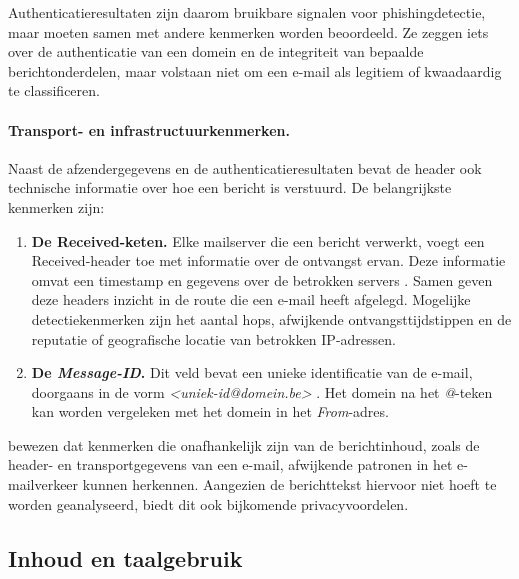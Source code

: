 Authenticatieresultaten zijn daarom bruikbare signalen voor phishingdetectie, maar moeten samen met andere kenmerken worden beoordeeld. Ze zeggen iets over de authenticatie van een domein en de integriteit van bepaalde berichtonderdelen, maar volstaan niet om een e-mail als legitiem of kwaadaardig te classificeren.

\paragraph{Transport- en infrastructuurkenmerken.}
\label{subsec:afzender-headers:transport}
Naast de afzendergegevens en de authenticatieresultaten bevat de header ook technische informatie over hoe een bericht is verstuurd. De belangrijkste kenmerken zijn:

\begin{enumerate}
    \item \textbf{De Received-keten.} Elke mailserver die een bericht verwerkt, voegt een Received-header toe met informatie over de ontvangst ervan. Deze informatie omvat een timestamp en gegevens over de betrokken servers \autocite{Resnick2008}. Samen geven deze headers inzicht in de route die een e-mail heeft afgelegd. Mogelijke detectiekenmerken zijn het aantal hops, afwijkende ontvangsttijdstippen en de reputatie of geografische locatie van betrokken IP-adressen.
    \item \textbf{De \emph{Message-ID}.} Dit veld bevat een unieke identificatie van de e-mail, doorgaans in de vorm \emph{<uniek-id@domein.be>} \autocite{Resnick2008}. Het domein na het \emph{@}-teken kan worden vergeleken met het domein in het \emph{From}-adres.
\end{enumerate}

\textcite{Gascon2018} bewezen dat kenmerken die onafhankelijk zijn van de berichtinhoud, zoals de header- en transportgegevens van een e-mail, afwijkende patronen in het e-mailverkeer kunnen herkennen. Aangezien de berichttekst hiervoor niet hoeft te worden geanalyseerd, biedt dit ook bijkomende privacyvoordelen.

\subsection{Inhoud en taalgebruik}%
\label{subsec:inhoud-taalgebruik}

